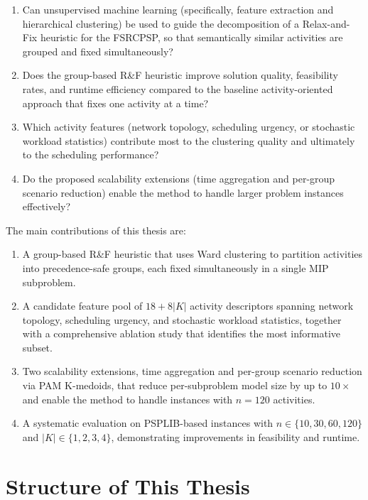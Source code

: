 \begin{enumerate}
  \item Can unsupervised machine learning (specifically, feature
        extraction and hierarchical clustering) be used to guide the
        decomposition of a Relax-and-Fix heuristic for the FSRCPSP, so that
        semantically similar activities are grouped and fixed
        simultaneously?
  \item Does the group-based R\&F heuristic improve solution quality,
        feasibility rates, and runtime efficiency compared to the baseline
        activity-oriented approach that fixes one activity at a time?
  \item Which activity features (network topology, scheduling urgency,
        or stochastic workload statistics) contribute most to the
        clustering quality and ultimately to the scheduling performance?
  \item Do the proposed scalability extensions (time aggregation and
        per-group scenario reduction) enable the method to handle larger
        problem instances effectively?
\end{enumerate}

The main contributions of this thesis are:
\begin{enumerate}
  \item A group-based R\&F heuristic that uses Ward clustering to
        partition activities into precedence-safe groups, each
        fixed simultaneously in a single MIP subproblem.
  \item A candidate feature pool of $18 + 8|K|$ activity
        descriptors spanning network topology, scheduling urgency,
        and stochastic workload statistics, together with a
        comprehensive ablation study that identifies the most
        informative subset.
  \item Two scalability extensions, time aggregation and per-group
        scenario reduction via PAM K-medoids, that reduce
        per-subproblem model size by up to $10\times$ and enable
        the method to handle instances with $n = 120$ activities.
  \item A systematic evaluation on PSPLIB-based instances with
        $n \in \{10, 30, 60, 120\}$ and $|K| \in \{1, 2, 3, 4\}$,
        demonstrating improvements in feasibility and runtime.
\end{enumerate}


\section{Structure of This Thesis}
\label{sec:structure}

